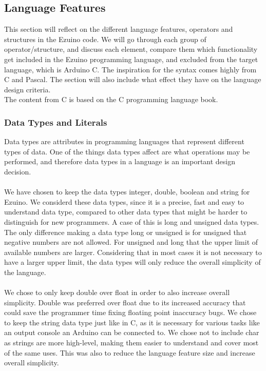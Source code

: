 \subsection{Language Features}\label{language-features}
This section will reflect on the different language features, operators and structures in the Ezuino code. We will go through each group of operator/structure, and discuss each element, compare them which functionality get included in the Ezuino programming language, and excluded from the target language, which is Arduino C. The inspiration for the syntax comes highly from C and Pascal. The section will also include what effect they have on the language design criteria.\\
The content from C is based on the C programming language book\cite{kernighan1988c}.
\subsubsection*{Data Types and Literals}
Data types are attributes in programming languages that represent different types of data. One of the things data types affect are what operations may be performed, and therefore data types in a language is an important design decision.
\\ \\
We have chosen to keep the data types integer, double, boolean and string for Ezuino. We considerd these data types, since it is a precise, fast and easy to understand data type, compared to other data types that might be harder to distinguish for new programmers. A case of this is long and unsigned data types. The only difference making a data type long or unsigned is for unsigned that negative numbers are not allowed. For unsigned and long that the upper limit of available numbers are larger. Considering that in most cases it is not necessary to have a larger upper limit, the data types will only reduce the overall simplicity of the language.
\\ \\
We chose to only keep double over float in order to also increase overall simplicity. Double was preferred over float due to its increased accuracy that could save the programmer time fixing floating point inaccuracy bugs. We chose to keep the string data type just like in C, as it is necessary for various tasks like an output console an Arduino can be connected to. We chose not to include char as strings are more high-level, making them easier to understand and cover most of the same uses. This was also to reduce the language feature size and increase overall simplicity.
